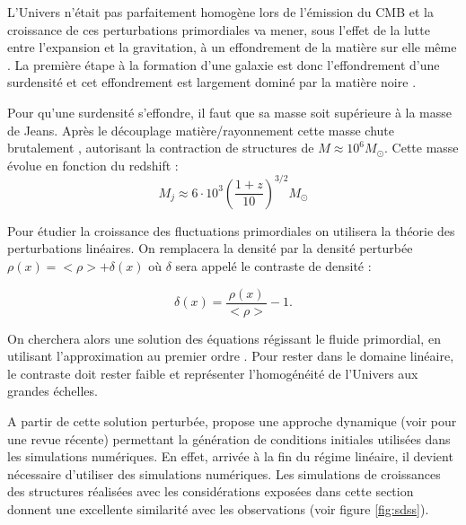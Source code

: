 L'Univers n'était pas parfaitement homogène lors de l'émission du \ac{CMB} et la croissance de ces perturbations primordiales va mener, sous l'effet de la lutte entre l'expansion et la gravitation, à un effondrement de la matière sur elle même \citep{1968ApJ...151..459S}.
La première étape à la formation d'une galaxie est donc l'effondrement d'une surdensité et cet effondrement est largement dominé par la matière noire \citep{1985ApJ...292..371D}.

Pour qu'une surdensité s'effondre, il faut que sa masse soit supérieure à la masse de Jeans.
Après le découplage matière/rayonnement cette masse chute brutalement \citep{2010gfe..book.....M}, autorisant la contraction de structures de $M \approx 10^6 M_\odot$.
Cette masse évolue en fonction du redshift \citep{2016PhR...645....1B} : 
\begin{equation}
M_j \approx 6 \cdot 10 ^3 \left( \frac{1+z}{10} \right)^{3/2} M_\odot
\end{equation}

Pour étudier la croissance des fluctuations primordiales on utilisera la théorie des perturbations linéaires.
On remplacera la densité par la densité perturbée $\rho(x) = <\rho> + \delta(x)$ où $\delta$ sera appelé le contraste de densité :

\begin{equation}
\delta(x) = \frac{\rho(x)}{<\rho>} -1.
\end{equation}

On cherchera alors une solution des équations régissant le fluide primordial, en utilisant l'approximation au premier ordre \citep{1999coph.book.....P}.
Pour rester dans le domaine linéaire, le contraste doit rester faible et représenter l'homogénéité de l'Univers aux grandes échelles.

A partir de cette solution perturbée, \cite{1970A&A.....5...84Z} propose une approche dynamique (voir \cite{2014MNRAS.439.3630W} pour une revue récente) permettant la génération de conditions initiales utilisées dans les simulations numériques.
En effet, arrivée à la fin du régime linéaire, il devient nécessaire d'utiliser des simulations numériques.
Les simulations de croissances des structures réalisées avec les considérations exposées dans cette section donnent une excellente similarité avec les observations (voir figure \ref{fig:sdss}).

